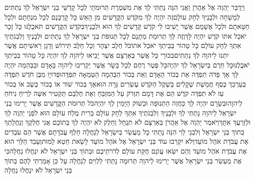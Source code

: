 \documentclass[../main/main.tex]{subfiles}
\begin{document}
\begin{multicols}{\ncols}
וַיְדַבֵּר יַהְוֶה אֶל אַהֲרֹן וַאֲנִי הִנֵּה נָתַתִּי לְךָ אֶת מִשְׁמֶרֶת תְּרוּמֹתָי לְכָל קָדְשֵׁי בְנֵי יִשְׂרָאֵל לְךָ נְתַתִּים לְמָשְׁחָה וּלְבָנֶיךָ לְחָק עוֹלָם\PreVerseSpace{}זֶה יִהְיֶה לְךָ מִקֹּדֶשׁ הַקֳּדָשִׁים מִן הָאֵשׁ כָּל קָרְבָּנָם לְכָל מִנְחָתָם וּלְכָל חַטָּאתָם וּלְכָל אֲשָׁמָם אֲשֶׁר יָשִׁיבוּ לִי קֹדֶשׁ קָדָשִׁים לְךָ הוּא וּלְבָנֶיךָ\PreVerseSpace{}בְּקֹדֶשׁ הַקֳּדָשִׁים תֹּאכֲלֶנּוּ כָּל זָכָר יֹאכַל אֹתוֹ קֹדֶשׁ יִהְיֶה לָּךְ\PreVerseSpace{}וְזֶה לְּךָ תְּרוּמַת מַתָּנָם לְכָל תְּנוּפֹת בְּנֵי יִשְׂרָאֵל לְךָ נְתַתִּים וּלְבָנֶיךָ וְלִבְנֹתֶיךָ אִתְּךָ לְחָק עוֹלָם כָּל טָהוֹר בְּבֵיתְךָ יֹאכַל אֹתוֹ\PreVerseSpace{}כֹּל חֵלֶב יִצְהָר וְכָל חֵלֶב תִּירוֹשׁ וְדָגָן רֵאשִׁיתָם אֲשֶׁר יִתְּנוּ לַיהוָה לְךָ נְתַתִּים\PreVerseSpace{}בִּכּוּרֵי כָּל אֲשֶׁר בְּאַרְצָם אֲשֶׁר יָבִיאוּ לַיהוָה לְךָ יִהְיֶה כָּל טָהוֹר בְּבֵיתְךָ יֹאכֲלֶנּוּ\PreVerseSpace{}כָּל חֵרֶם בְּיִשְׂרָאֵל לְךָ יִהְיֶה\PreVerseSpace{}כָּל פֶּטֶר רֶחֶם לְכָל בָּשָׂר אֲשֶׁר יַקְרִיבוּ לַיהוָה בָּאָדָם וּבַבְּהֵמָה יִהְיֶה לָּךְ אַךְ פָּדֹה תִפְדֶּה אֵת בְּכוֹר הָאָדָם וְאֵת בְּכוֹר הַבְּהֵמָה הַטְּמֵאָה תִּפְדֶּה\PreVerseSpace{}וּפְדוּיָו מִבֶּן חֹדֶשׁ תִּפְדֶּה בְּעַרְכַּךְ\SubEnd{} כֶּסֶף חֲמֵשֶׁת שְׁקָלִים בְּשֶׁקֶל הַקֹּדֶשׁ עֶשְׂרִים גֵּרָה הוּא\PreVerseSpace{}אַךְ בְּכוֹר שׁוֹר אוֹ בְכוֹר כֶּשֶׂב אוֹ בְכוֹר עֵז לֹא תִפְדֶּה קֹדֶשׁ הֵם אֶת דָּמָם תִּזְרֹק עַל הַמִּזְבֵּחַ וְאֶת חֶלְבָּם תַּקְטִיר אִשֶּׁה לְרֵיחַ נִיחֹחַ לַיהוָה\PreVerseSpace{}וּבְשָׂרָם יִהְיֶה לָּךְ כַּחֲזֵה הַתְּנוּפָה וּכְשׁוֹק הַיָּמִין לְךָ יִהְיֶה\PreVerseSpace{}כֹּל תְּרוּמֹת הַקֳּדָשִׁים אֲשֶׁר יָרִימוּ בְנֵי יִשְׂרָאֵל לַיהוָה נָתַתִּי לְךָ וּלְבָנֶיךָ וְלִבְנֹתֶיךָ אִתְּךָ לְחָק עוֹלָם בְּרִית מֶלַח עוֹלָם הוּא לִפְנֵי יַהְוֶה לְךָ וּלְזַרְעֲךָ אִתָּךְ\PreVerseSpace{}וַיֹּאמֶר יַהְוֶה אֶל אַהֲרֹן בְּאַרְצָם לֹא תִנְחָל וְחֵלֶק לֹא יִהְיֶה לְךָ בְּתוֹכָם אֲנִי חֶלְקְךָ וְנַחֲלָתְךָ בְּתוֹךְ בְּנֵי יִשְׂרָאֵל \ClosedSection{}וְלִבְנֵי לֵוִי הִנֵּה נָתַתִּי כָּל מַעֲשֵׂר בְּיִשְׂרָאֵל לְנַחֲלָה חֵלֶף עֲבֹדָתָם אֲשֶׁר הֵם עֹבְדִים אֶת עֲבֹדַת אֹהֶל מוֹעֵד\PreVerseSpace{}וְלֹא יִקְרְבוּ עוֹד בְּנֵי יִשְׂרָאֵל אֶל אֹהֶל מוֹעֵד לָשֵׂאת חֵטְא לָמוּת\PreVerseSpace{}וְעָבַד הַלֵּוִי הוּא אֶת עֲבֹדַת אֹהֶל מוֹעֵד וְהֵם יִשְׂאוּ עֲוֺנָם חֻקַּת עוֹלָם לְדֹרֹתֵיכֶם וּבְתוֹךְ בְּנֵי יִשְׂרָאֵל לֹא יִנְחֲלוּ נַחֲלָה\PreVerseSpace{}כִּי אֶת מַעְשַׂר בְּנֵי יִשְׂרָאֵל אֲשֶׁר יָרִימוּ לַיהוָה תְּרוּמָה נָתַתִּי לַלְוִיִּם לְנַחֲלָה עַל כֵּן אָמַרְתִּי לָהֶם בְּתוֹךְ בְּנֵי יִשְׂרָאֵל לֹא יִנְחֲלוּ נַחֲלָה\OpenSection{}\par

\end{multicols}
\end{document}
